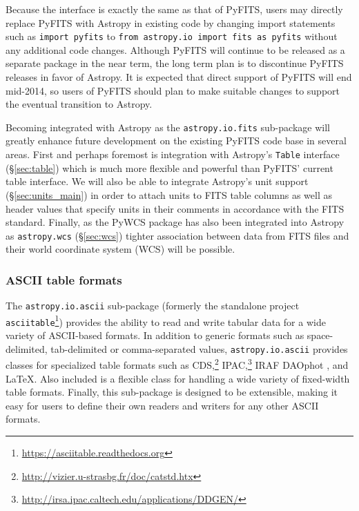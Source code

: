 \documentclass[traditabstract]{aa}
\begin{document}
Because the interface is exactly the same as that of PyFITS, users may directly
replace PyFITS with Astropy in existing code by changing import statements such as
\texttt{import pyfits} to \texttt{from astropy.io import fits as pyfits}
without any additional code changes. Although PyFITS will continue to be
released as a separate package in the near term, the long term plan is to
discontinue PyFITS releases in favor of Astropy. It is expected that direct
support of PyFITS will end mid-2014, so users of PyFITS should plan to make
suitable changes to support the eventual transition to Astropy.

Becoming integrated with Astropy as the \texttt{astropy.io.fits} sub-package
will greatly enhance future development on the existing PyFITS code base in
several areas. First and perhaps foremost is integration with Astropy's
\texttt{Table} interface (\S\ref{sec:table}) which is much more flexible and
powerful than PyFITS' current table interface. We will also be able to
integrate Astropy's unit support (\S\ref{sec:units_main}) in order to attach
units to FITS table columns as well as header values that specify units in
their comments in accordance with the FITS standard. Finally, as the PyWCS
package has also been integrated into Astropy as \texttt{astropy.wcs}
(\S\ref{sec:wcs}) tighter association between data from FITS files and their
world coordinate system (WCS) will be possible.

\subsubsection{ASCII table formats}

\label{sec:ascii}

The \texttt{astropy.io.ascii} sub-package (formerly the standalone project
\texttt{asciitable}\footnote{\url{https://asciitable.readthedocs.org}})
provides the ability to read and write tabular data for a wide variety of
ASCII-based formats. In addition to generic formats such as space-delimited,
tab-delimited or comma-separated values, \texttt{astropy.io.ascii} provides
classes for specialized table formats such as
CDS,\footnote{\url{http://vizier.u-strasbg.fr/doc/catstd.htx}}
IPAC,\footnote{\url{http://irsa.ipac.caltech.edu/applications/DDGEN/}}
IRAF DAOphot \citep{daophot}, and LaTeX. Also included is a flexible class for handling a wide
variety of fixed-width table formats. Finally, this sub-package is designed to be
extensible, making it easy for users to define their own readers and writers for
any other ASCII formats.
\end{document}

